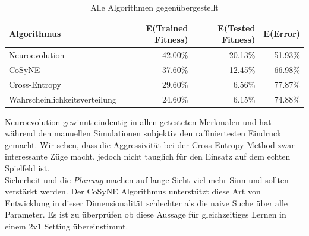                 \begin{table}[H]
                    \begin{center}
                    \begin{tabular}{ |l|r|r|r| } 
                        \hline
                        \textbf{Algorithmus}          & E(Trained Fitness) & E(Tested Fitness) & E(Error)    \\ \hline
                        Neuroevolution                &          42.00\%   &         20.13\%   &    51.93\%  \\ \hline
                        CoSyNE                        &          37.60\%   &         12.45\%   &    66.98\%  \\ \hline
                        Cross-Entropy                 &          29.60\%   &          6.56\%   &    77.87\%  \\ \hline
                        Wahrscheinlichkeitsverteilung &          24.60\%   &          6.15\%   &    74.88\%  \\ \hline
                    \end{tabular}
                    \end{center}
                    \caption{Alle Algorithmen gegenübergestellt \label{fig:vergleichstabelle}}
                \end{table}

            \noindent
            Neuroevolution gewinnt eindeutig in allen getesteten Merkmalen und hat während den manuellen Simulationen subjektiv den raffiniertesten Eindruck gemacht. Wir sehen, dass die Aggressivität bei der Cross-Entropy Method zwar interessante Züge macht, jedoch nicht tauglich für den Einsatz auf dem echten Spielfeld ist. \\[2mm]

            \noindent
            Sicherheit und die \textit{Planung} machen auf lange Sicht viel mehr Sinn und sollten verstärkt werden. Der CoSyNE Algorithmus unterstützt diese Art von Entwicklung in dieser Dimensionalität schlechter als die naive Suche über alle Parameter. Es ist zu überprüfen ob diese Aussage für gleichzeitiges Lernen in einem 2v1 Setting übereinstimmt.\\[2mm]

